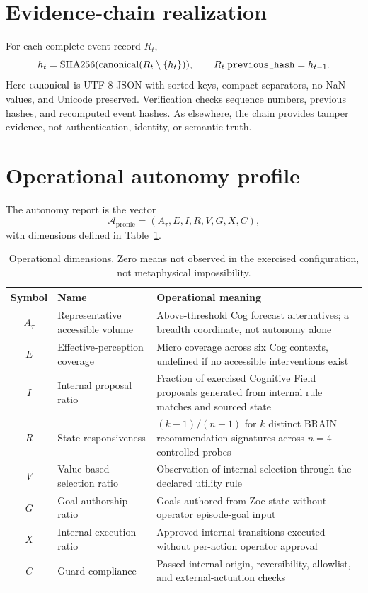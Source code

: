 \section{Evidence-chain realization}
For each complete event record $R_t$,
\begin{equation}
h_t=\operatorname{SHA256}(\operatorname{canonical}(R_t\setminus\{h_t\})),
\qquad R_t.\texttt{previous\_hash}=h_{t-1}.
\label{eq:autonomy-chain}
\end{equation}
Here $\operatorname{canonical}$ is UTF-8 JSON with sorted keys, compact separators, no NaN values, and Unicode preserved. Verification checks sequence numbers, previous hashes, and recomputed event hashes. As elsewhere, the chain provides tamper evidence, not authentication, identity, or semantic truth.

\section{Operational autonomy profile}
\begin{definition}
The autonomy report is the vector
\begin{equation}
\mathcal A_{\mathrm{profile}}=(A_\tau,E,I,R,V,G,X,C),
\label{eq:autonomy-profile}
\end{equation}
with dimensions defined in Table~\ref{tab:profile-dimensions}.
\end{definition}
\begin{table}[htbp]
\centering
\caption{Operational dimensions. Zero means not observed in the exercised configuration, not metaphysical impossibility.}
\label{tab:profile-dimensions}
{\small
\begin{tabularx}{\textwidth}{clX}
\toprule
Symbol&Name&Operational meaning\\
\midrule
$A_\tau$&Representative accessible volume&Above-threshold Cog forecast alternatives; a breadth coordinate, not autonomy alone\\
$E$&Effective-perception coverage&Micro coverage across six Cog contexts, undefined if no accessible interventions exist\\
$I$&Internal proposal ratio&Fraction of exercised Cognitive Field proposals generated from internal rule matches and sourced state\\
$R$&State responsiveness&$(k-1)/(n-1)$ for $k$ distinct BRAIN recommendation signatures across $n=4$ controlled probes\\
$V$&Value-based selection ratio&Observation of internal selection through the declared utility rule\\
$G$&Goal-authorship ratio&Goals authored from Zoe state without operator episode-goal input\\
$X$&Internal execution ratio&Approved internal transitions executed without per-action operator approval\\
$C$&Guard compliance&Passed internal-origin, reversibility, allowlist, and external-actuation checks\\
\bottomrule
\end{tabularx}}
\end{table}

